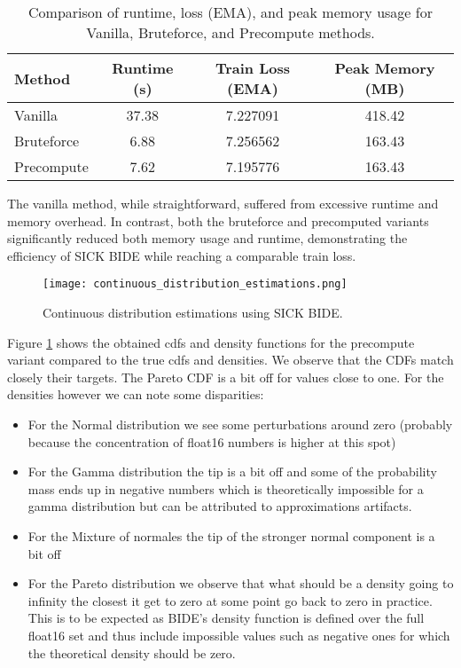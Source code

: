 \documentclass{article}
\begin{document}
\begin{table}[ht]
    \centering
    \begin{tabular}{l S[table-format=2.2] S[table-format=1.6] S[table-format=3.2]}
    \toprule
    \textbf{Method} & \textbf{Runtime (s)} & \textbf{Train Loss (EMA)} & \textbf{Peak Memory (MB)} \\ 
    \midrule
    Vanilla & 37.38 & 7.227091 & 418.42 \\ 
    Bruteforce & 6.88 & 7.256562 & 163.43 \\ 
    Precompute & 7.62 & 7.195776 & 163.43 \\ 
    \bottomrule
    \end{tabular}
    \captionsetup{justification=centering, skip=10pt} %
    \caption{Comparison of runtime, loss (EMA), and peak memory usage for Vanilla, Bruteforce, and Precompute methods.}
    \label{tab:method_comparison}
\end{table}

The vanilla method, while straightforward, suffered from excessive runtime and memory overhead. In contrast, both the bruteforce and precomputed variants significantly reduced both memory usage and runtime, demonstrating the efficiency of SICK BIDE while reaching a comparable train loss.

\begin{figure}[ht]
    \centering
    \texttt{[image: continuous\_distribution\_estimations.png]}
    \captionsetup{justification=centering} %
    \caption{Continuous distribution estimations using SICK BIDE.}
    \label{fig:continuous_distribution}
\end{figure}

Figure \ref{fig:continuous_distribution} shows the obtained cdfs and density functions for the precompute variant compared to the true cdfs and densities. We observe that the CDFs match closely their targets. The Pareto CDF is a bit off for values close to one.
For the densities however we can note some disparities:
\begin{itemize}
    \item For the Normal distribution we see some perturbations around zero (probably because the concentration of float16 numbers is higher at this spot)
    \item For the Gamma distribution the tip is a bit off and some of the probability mass ends up in negative numbers which is theoretically impossible for a gamma distribution but can be attributed to approximations artifacts.
    \item For the Mixture of normales the tip of the stronger normal component is a bit off
    \item For the Pareto distribution we observe that what should be a density going to infinity the closest it get to zero at some point go back to zero in practice. This is to be expected as BIDE's density function is defined over the full float16 set and thus include impossible values such as negative ones for which the theoretical density should be zero.  
\end{itemize}
\end{document}
